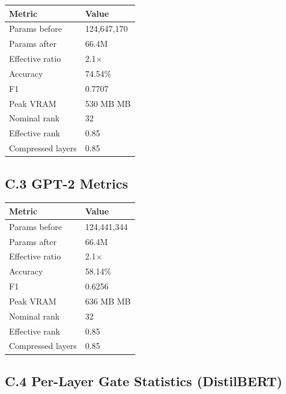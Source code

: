 \begin{table}[H]
\centering
\small
\begin{tabular}{ll}
\toprule
\textbf{Metric} & \textbf{Value} \\
\midrule
Params before & 124,647,170 \\
Params after & 66.4M \\
Effective ratio & 2.1$\times$ \\
Accuracy & 74.54\% \\
F1 & 0.7707 \\
Peak VRAM & 530 MB MB \\
Nominal rank & 32 \\
Effective rank & 0.85 \\
Compressed layers & 0.85 \\
\bottomrule
\end{tabular}
\end{table}

\subsection{C.3 GPT-2 Metrics}

\begin{table}[H]
\centering
\small
\begin{tabular}{ll}
\toprule
\textbf{Metric} & \textbf{Value} \\
\midrule
Params before & 124,441,344 \\
Params after & 66.4M \\
Effective ratio & 2.1$\times$ \\
Accuracy & 58.14\% \\
F1 & 0.6256 \\
Peak VRAM & 636 MB MB \\
Nominal rank & 32 \\
Effective rank & 0.85 \\
Compressed layers & 0.85 \\
\bottomrule
\end{tabular}
\end{table}

\subsection{C.4 Per-Layer Gate Statistics (DistilBERT)}

